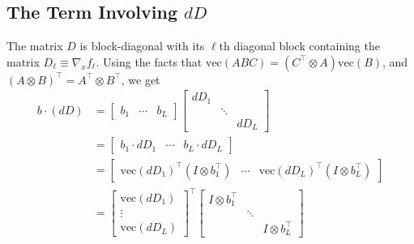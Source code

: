 \documentclass{article}
\begin{document}
\subsection{The Term Involving $dD$}

The matrix $D$ is block-diagonal with its $\ell$th diagonal block containing
the matrix $D_\ell \equiv \nabla_x f_\ell$. Using the facts that
$\mathrm{vec}(ABC) = \left(C^\top \otimes A \right) \mathrm{vec}(B)$, and
$(A\otimes B)^\top = A^\top \otimes B^\top$, we get
\begin{align}
    b\cdot (dD) & =
    \begin{bmatrix}
        b_1 & \cdots & b_L
    \end{bmatrix}
    \begin{bmatrix}
        dD_1 &        &      \\
             & \ddots &      \\
             &        & dD_L
    \end{bmatrix}
    \nonumber                                                                            \\
                & = \begin{bmatrix}
                        b_1 \cdot dD_1 & \cdots & b_L \cdot dD_L
                    \end{bmatrix}
    \nonumber                                                                            \\
                & = \begin{bmatrix}
                        \mathrm{vec}\left(dD_1\right)^\top \left(I \otimes b_1^\top\right) &
                        \cdots                                                             &
                        \mathrm{vec}\left(dD_L\right)^\top \left(I \otimes b_L^\top\right)
                    \end{bmatrix}
    \nonumber                                                                            \\
                & = \begin{bmatrix}
                        \mathrm{vec}\left(dD_1\right) \\
                        \vdots                        \\
                        \mathrm{vec}\left(dD_L\right)
                    \end{bmatrix}
    ^\top
    \begin{bmatrix}
        I \otimes b_1^\top &        &                    \\
                           & \ddots &                    \\
                           &        & I \otimes b_L^\top
    \end{bmatrix}
\end{align}
\end{document}
